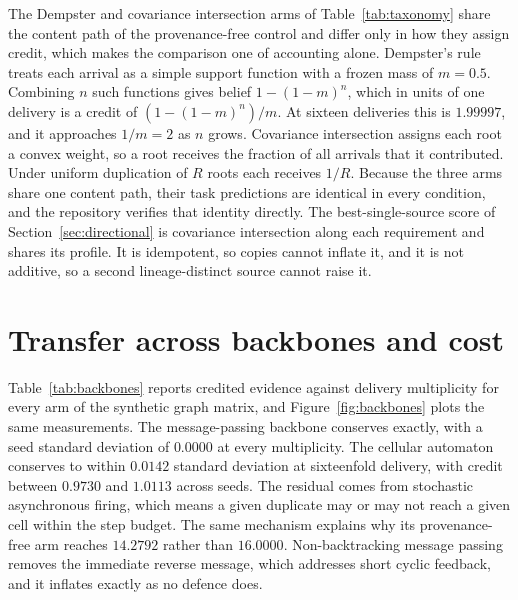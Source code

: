 \documentclass{article}
\begin{document}
The Dempster and covariance intersection arms of Table~\ref{tab:taxonomy} share
the content path of the provenance-free control and differ only in how they
assign credit, which makes the comparison one of accounting alone. Dempster's
rule \citep{shafer1976dempster} treats each arrival as a simple support function
with a frozen mass of $m = 0.5$. Combining $n$ such functions gives belief
$1-(1-m)^n$, which in units of one delivery is a credit of $(1-(1-m)^n)/m$. At
sixteen deliveries this is $1.99997$, and it approaches $1/m = 2$ as $n$ grows.
Covariance intersection \citep{julier1997ci} assigns each root a convex weight,
so a root receives the fraction of all arrivals that it contributed. Under
uniform duplication of $R$ roots each receives $1/R$. Because the three arms
share one content path, their task predictions are identical in every condition,
and the repository verifies that identity directly. The best-single-source score
of Section~\ref{sec:directional} is covariance intersection along each
requirement and shares its profile. It is idempotent, so copies cannot inflate
it, and it is not additive, so a second lineage-distinct source cannot raise it.

\section{Transfer across backbones and cost}
\label{app:transfer}

Table~\ref{tab:backbones} reports credited evidence against delivery
multiplicity for every arm of the synthetic graph matrix, and
Figure~\ref{fig:backbones} plots the same measurements. The message-passing
backbone \citep{gilmer2017mpnn} conserves exactly, with a seed standard
deviation of $0.0000$ at every multiplicity. The cellular automaton
\citep{mordvintsev2020growing} conserves to within $0.0142$ standard deviation
at sixteenfold delivery, with credit between $0.9730$ and $1.0113$ across seeds.
The residual comes from stochastic asynchronous firing, which means a given
duplicate may or may not reach a given cell within the step budget. The same
mechanism explains why its provenance-free arm reaches $14.2792$ rather than
$16.0000$. Non-backtracking message passing \citep{park2024nba} removes the
immediate reverse message, which addresses short cyclic feedback, and it
inflates exactly as no defence does.
\end{document}
